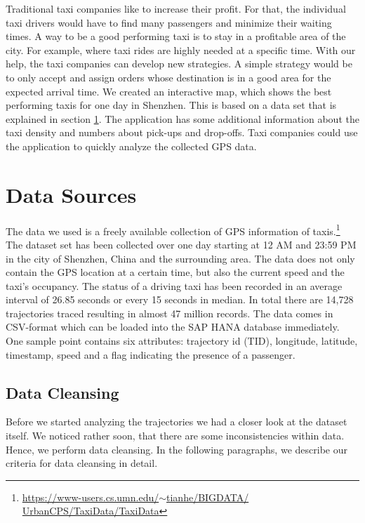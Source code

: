 \documentclass[10pt]{sig-alternate}
\begin{document}
Traditional taxi companies like to increase their profit. For that, the individual taxi drivers would have to find many passengers and minimize their waiting times. A way to be a  good performing taxi is to stay in a profitable area of the city. For example, where taxi rides are highly needed at a specific time. With our help, the taxi companies can develop new strategies. A simple strategy would be to only accept and assign orders whose destination is in a good area for the expected arrival time. We created an interactive map, which shows the best performing taxis for one day in Shenzhen. This is based on a data set that is explained in section \ref{sec:ds}. The application has some additional information about the taxi density and numbers about pick-ups and drop-offs. Taxi companies could use the application to quickly analyze the collected GPS data.\\

\section{Data Sources}
\label{sec:ds}

The data we used is a freely available collection of GPS information of taxis.\footnote{\href{https://www-users.cs.umn.edu/~tianhe/BIGDATA/UrbanCPS/TaxiData/TaxiData}{https://www-users.cs.umn.edu/$\sim$tianhe/BIGDATA/\\UrbanCPS/TaxiData/TaxiData}} The dataset set has been collected over one day starting at 12 AM and 23:59 PM in the city of Shenzhen, China and the surrounding area. The data does not only contain the GPS location at a certain time, but also the current speed and the taxi's occupancy. The status of a driving taxi has been recorded in an average interval of 26.85 seconds or every 15 seconds in median. In total there are 14,728 trajectories traced resulting in almost 47 million records. The data comes in CSV-format which can be loaded into the SAP HANA database immediately. One sample point contains six attributes: trajectory id (TID), longitude, latitude, timestamp, speed and a flag indicating the presence of a passenger.

\subsection{Data Cleansing}
Before we started analyzing the trajectories we had a closer look at the dataset itself. We noticed rather soon, that there are some inconsistencies within data. Hence, we perform data cleansing. In the following paragraphs, we describe our criteria for data cleansing in detail.
\end{document}
